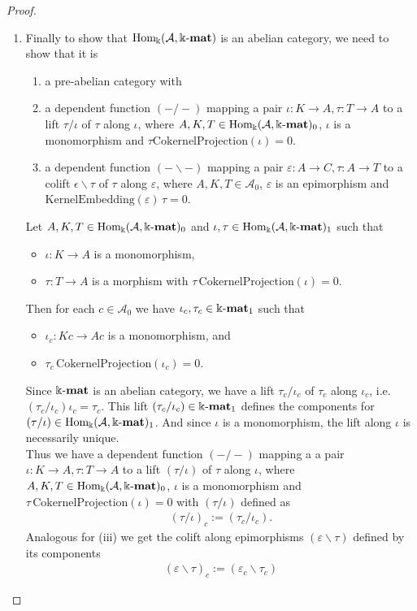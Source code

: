 \begin{proof}
\begin{enumerate}
\item Finally to show that $\mathrm{Hom_{\Bbbk}}(\mathcal{A},\Bbbk\textnormal{-}\mathbf{mat})$ is an abelian category, we need to show that it is
\begin{enumerate}
\renewcommand{\labelenumii}{(\roman{enumii})}
\item a pre-abelian category with
\item a dependent function $(-/-)$ mapping a pair $\iota : K \rightarrow A, \tau : T \rightarrow A$ to a lift $\tau / \iota$ of
$\tau$ along $\iota$, where $A, K, T \in \mathrm{Hom_{\Bbbk}}(\mathcal{A},\Bbbk\textnormal{-}\mathbf{mat})_{0}$, $\iota$ is a monomorphism and $\tau \mathrm{CokernelProjection}(\iota) = 0$.
\item a dependent function $(-\backslash -)$ mapping a pair $\varepsilon : A \rightarrow C, \tau : A \rightarrow T$ to a colift
$\epsilon \backslash \tau$ of $\tau$ along $\varepsilon$, where $A, K, T \in \mathcal{A}_{0}$, $\varepsilon$ is an epimorphism and
$\mathrm{KernelEmbedding}(\varepsilon)\,\tau = 0$.
\end{enumerate}
\begin{subproof}
Let $A, K, T \in \mathrm{Hom_{\Bbbk}}(\mathcal{A},\Bbbk\textnormal{-}\mathbf{mat})_{0}$ and $\iota, \tau \in \mathrm{Hom_{\Bbbk}}(\mathcal{A},\Bbbk\textnormal{-}\mathbf{mat})_{1}$ such that 
\begin{itemize}
\item $\iota : K \rightarrow A$ is a monomorphism,
\item $\tau : T \rightarrow A$ is a morphism with $\tau \, \mathrm{CokernelProjection}(\iota) = 0$.
\end{itemize}
Then for each $c \in \mathcal{A}_{0}$ we have $\iota_{c}, \tau_{c} \in \Bbbk\textnormal{-}\mathbf{mat}_{1}$ such that
\begin{itemize}
\item $\iota_{c} : Kc \rightarrow Ac$ is a monomorphism, and
\item $\tau_{c} \, \mathrm{CokernelProjection}(\iota_{c}) = 0$.
\end{itemize}
Since $\Bbbk\textnormal{-}\mathbf{mat}$ is an abelian category, we have a lift $\tau_{c} / \iota_{c}$ of $\tau_{c}$ along $\iota_{c}$, i.e.
$(\tau_{c} / \iota_{c}) \iota_{c} = \tau_{c}$.
This lift $(\tau_{c} / \iota_{c}) \in \Bbbk\textnormal{-}\mathbf{mat}_{1}$ defines the components for $(\tau / \iota) \in \mathrm{Hom_{\Bbbk}}(\mathcal{A},\Bbbk\textnormal{-}\mathbf{mat})_{1}$. And since
$\iota$ is a monomorphism, the lift along $\iota$ is necessarily unique.\\
Thus we have a dependent function $( - / - )$ mapping a
a pair $\iota : K \rightarrow A, \tau : T \rightarrow A$ to a lift $(\tau / \iota)$ of
$\tau$ along $\iota$, where $A, K, T \in \mathrm{Hom_{\Bbbk}}(\mathcal{A},\Bbbk\textnormal{-}\mathbf{mat})_{0}$, $\iota$ is a monomorphism and $\tau \, \mathrm{CokernelProjection}(\iota) = 0$
with $(\tau / \iota)$ defined as
\begin{align}
(\tau / \iota)_{c} := (\tau_{c} / \iota_{c}).
\end{align}
Analogous for (iii) we get the colift along epimorphisms $(\varepsilon \backslash \tau)$ defined by its components
\begin{align}
(\varepsilon \backslash \tau)_{c} := (\varepsilon_{c} \backslash \tau_{c})
\end{align}


\end{subproof}
\end{enumerate}
\end{proof}


